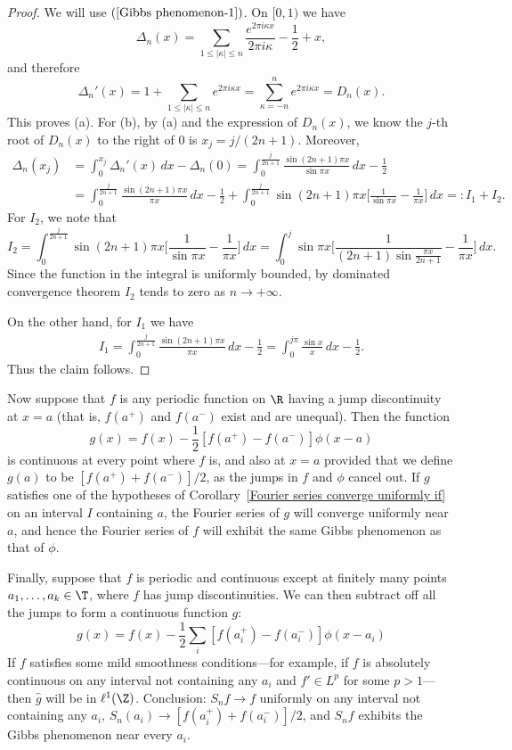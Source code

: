 \begin{proof}
We will use $(\ref{Gibbs phenomenon-1})$. On $[0,1)$ we have
\[\Delta_n(x)=\sum_{1\leq|\kappa|\leq n}\frac{e^{2\pi i\kappa x}}{2\pi i\kappa}-\frac{1}{2}+x,\]
and therefore
\[\Delta_n'(x)=1+\sum_{1\leq|\kappa|\leq n}e^{2\pi i\kappa x}=\sum_{\kappa=-n}^{n}e^{2\pi i\kappa x}=D_n(x).\]
This proves (a). For (b), by (a) and the expression of $D_n(x)$, we know the $j$-th root of $D_n(x)$ to the right of $0$ is $x_j=j/(2n+1)$. Moreover,
\begin{align*}
\Delta_n(x_j)&=\int_{0}^{x_j}\Delta_n'(x)\,dx-\Delta_n(0)=\int_{0}^{\frac{j}{2n+1}}\frac{\sin(2n+1)\pi x}{\sin\pi x}\,dx-\frac{1}{2}\\
&=\int_{0}^{\frac{j}{2n+1}}\frac{\sin(2n+1)\pi x}{\pi x}\,dx-\frac{1}{2}+\int_{0}^{\frac{j}{2n+1}}\sin(2n+1)\pi x\Big[\frac{1}{\sin\pi x}-\frac{1}{\pi x}\Big]\,dx=:I_1+I_2.
\end{align*}
For $I_2$, we note that
\[I_2=\int_{0}^{\frac{j}{2n+1}}\sin(2n+1)\pi x\Big[\frac{1}{\sin\pi x}-\frac{1}{\pi x}\Big]\,dx=\int_{0}^{j}\sin\pi x\Big[\frac{1}{(2n+1)\sin\frac{\pi x}{2n+1}}-\frac{1}{\pi x}\Big]\,dx.\]
Since the function in the integral is uniformly bounded, by dominated convergence theorem $I_2$ tends to zero as $n\to+\infty$.\par
On the other hand, for $I_1$ we have
\begin{align*}
I_1=\int_{0}^{\frac{j}{2n+1}}\frac{\sin(2n+1)\pi x}{\pi x}\,dx-\frac{1}{2}=\int_{0}^{j\pi}\frac{\sin x}{x}\,dx-\frac{1}{2}.
\end{align*}
Thus the claim follows.
\end{proof}
Now suppose that $f$ is any periodic function on $\R$ having a jump discontinuity at $x=a$ (that is, $f(a^+)$ and $f(a^-)$ exist and are unequal). Then the function
\[g(x)=f(x)-\frac{1}{2}[f(a^+)-f(a^-)]\phi(x-a)\]
is continuous at every point where $f$ is, and also at $x=a$ provided that we define $g(a)$ to be $[f(a^+)+f(a^-)]/2$, as the jumps in $f$ and $\phi$ cancel out. If $g$ satisfies one of the hypotheses of Corollary~\ref{Fourier series converge uniformly if} on an interval $I$ containing $a$, the Fourier series of $g$ will converge uniformly near $a$, and hence the Fourier series of $f$ will exhibit the same Gibbs phenomenon as that of $\phi$.\par
Finally, suppose that $f$ is periodic and continuous except at finitely many points $a_1,\dots,a_k\in\T$, where $f$ has jump discontinuities. We can then subtract off all the jumps to form a continuous function $g$:
\[g(x)=f(x)-\frac{1}{2}\sum_i[f(a_i^+)-f(a_i^-)]\phi(x-a_i)\]
If $f$ satisfies some mild smoothness conditions---for example, if $f$ is absolutely continuous on any interval not containing any $a_i$ and $f'\in L^p$ for some $p>1$---then $\hat{g}$ will be in $\ell^1(\Z)$. Conclusion: $S_nf\to f$ uniformly on any interval not containing any $a_i$, $S_n(a_i)\to[f(a_i^+)+f(a_i^-)]/2$, and $S_nf$ exhibits the Gibbs phenomenon near every $a_i$.
